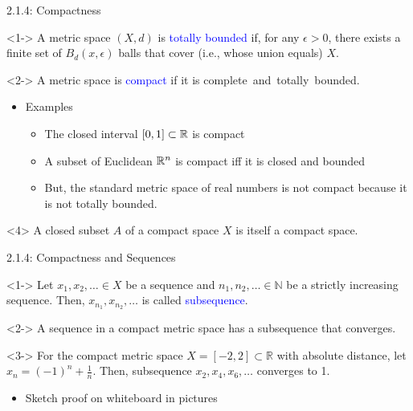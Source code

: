 \documentclass[10pt,english]{beamer}
\begin{document}
\begin{frame}{2.1.4: Compactness}

\begin{definition}<1->
A metric space $(X,d)$ is \textcolor{blue}{totally bounded} if, for any $\epsilon > 0$, there exists a finite set of $B_d (x,\epsilon)$ balls that cover (i.e., whose union equals) $X$.
\end{definition}

\begin{definition}<2->
A metric space is \textcolor{blue}{compact} if it is complete~and~totally~bounded.
\end{definition}

\begin{itemize}
\setlength\itemsep{3mm}
\item<3-> Examples \vspace{1mm}
\begin{itemize} 
  \setlength\itemsep{1.5mm}
  \item The closed interval $[0,1]\subset \mathbb{R}$ is compact
  \item A subset of Euclidean $\mathbb{R}^n$ is compact iff it is closed and bounded
  \item But, the standard metric space of real numbers is not compact because it is not totally bounded.
\end{itemize}

\end{itemize}

\begin{theorem}<4>
A closed subset $A$ of a compact space $X$ is itself a compact space.
\end{theorem}

\end{frame}

\begin{frame}{2.1.4: Compactness and Sequences}

\begin{definition}<1->
Let $x_1,x_2,\ldots \in X$ be a sequence and $n_1,n_2,\ldots\in \mathbb{N}$ be
a strictly increasing sequence.
Then, $x_{n_1},x_{n_2},\ldots$ is called \textcolor{blue}{subsequence}.
\end{definition}

\begin{theorem}<2->
A sequence in a compact metric space has a subsequence that converges.
\end{theorem}

\begin{example}<3->
For the compact metric space $X=[-2,2]\subset \mathbb{R}$ with absolute distance, let $x_n = (-1)^n + \frac{1}{n}$.
Then, subsequence $x_2,x_4,x_6,\ldots$ converges to 1.
\end{example}

\begin{itemize}
\item<3-> Sketch proof on whiteboard in pictures
\end{itemize}

\end{frame}
\end{document}
